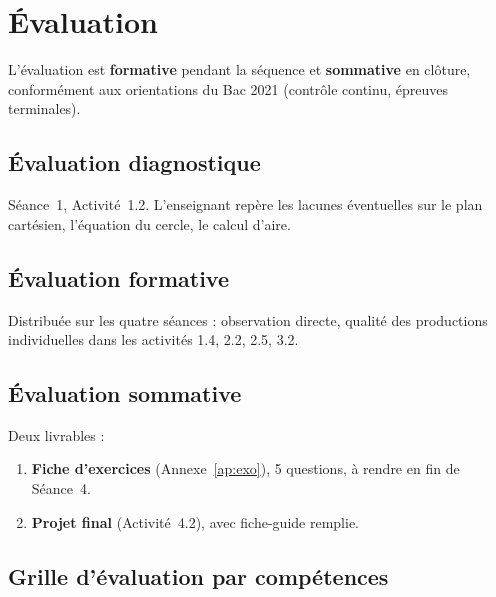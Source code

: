 \documentclass[12pt,a4paper]{scrartcl}
\newcommand{\acc}[1]{\textcolor{accent}{\textbf{#1}}}
\begin{document}
\section{Évaluation}

L'évaluation est \acc{formative} pendant la séquence et \acc{sommative} en clôture, conformément aux orientations du Bac 2021 (contrôle continu, épreuves terminales).

\subsection{Évaluation diagnostique}
Séance~1, Activité~1.2. L'enseignant repère les lacunes éventuelles sur le plan cartésien, l'équation du cercle, le calcul d'aire.

\subsection{Évaluation formative}
Distribuée sur les quatre séances : observation directe, qualité des productions individuelles dans les activités 1.4, 2.2, 2.5, 3.2.

\subsection{Évaluation sommative}
Deux livrables :
\begin{enumerate}[leftmargin=1.5em,itemsep=0.2em,topsep=0.3em,nosep]
  \item \textbf{Fiche d'exercices} (Annexe~\ref{ap:exo}), 5 questions, à rendre en fin de Séance~4.
  \item \textbf{Projet final} (Activité~4.2), avec fiche-guide remplie.
\end{enumerate}

\subsection{Grille d'évaluation par compétences}
\end{document}

